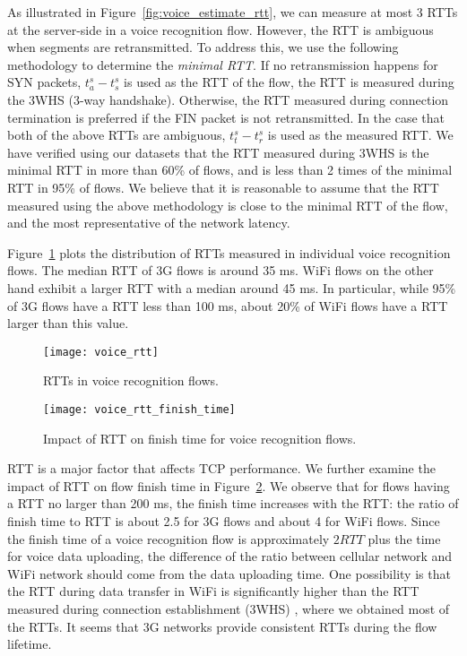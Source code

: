As illustrated in Figure~\ref{fig:voice_estimate_rtt}, we can measure at most 3 RTTs at the server-side in a voice recognition flow. However, the RTT is ambiguous when segments are retransmitted. To address this, we use the following methodology to determine the \emph{minimal RTT}. If no retransmission happens for SYN packets, $t^s_a - t^s_s$ is used as the RTT of the flow, \ie the RTT is measured during the 3WHS (3-way handshake). Otherwise, the RTT measured during connection termination is preferred if the FIN packet is not retransmitted. In the case that both of the above RTTs are ambiguous, $t^s_t - t^s_r$ is used as the measured RTT. We have verified using our datasets that the RTT measured during 3WHS is the minimal RTT in more than 60\% of flows, and is less than 2 times of the minimal RTT in 95\% of flows. We believe that it is reasonable to assume that the RTT measured using the above methodology is close to the minimal RTT of the flow, and the most representative of the network latency.

Figure~\ref{fig:voice_rtt} plots the distribution of RTTs measured in individual voice recognition flows. The median RTT of 3G flows is around 35 ms. WiFi flows on the other hand exhibit a larger RTT with a median around 45 ms. In particular, while 95\% of 3G flows have a RTT less than 100 ms, about 20\% of WiFi flows have a RTT larger than this value.

\begin{figure}[th]
\centering
	\texttt{[image: voice\_rtt]}
\caption{RTTs in voice recognition flows.}
\label{fig:voice_rtt}
\end{figure}

\begin{figure}[th]
\centering
	\texttt{[image: voice\_rtt\_finish\_time]}
\caption{Impact of RTT on finish time for voice recognition flows.}
\label{fig:v_rtt_time}
\end{figure}

RTT is a major factor that affects TCP performance. We further examine the impact of RTT on flow finish time in Figure~\ref{fig:v_rtt_time}. We observe that for flows having a RTT no larger than 200 ms, the finish time increases with the RTT: the ratio of finish time to RTT is about 2.5 for 3G flows and about 4 for WiFi flows. Since the finish time of a voice recognition flow is approximately $2RTT$ plus the time for voice data uploading, the difference of the ratio between cellular network and WiFi network should come from the data uploading time. One possibility is that the RTT during data transfer in WiFi is significantly higher than the RTT measured during connection establishment (\ie 3WHS) \cite{UM-CS-2012-022}, where we obtained most of the RTTs. It seems that 3G networks provide consistent RTTs during the flow lifetime.

